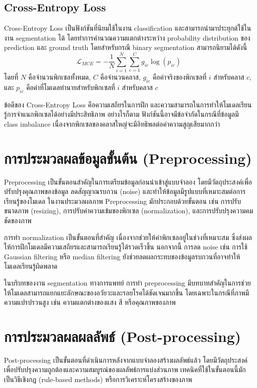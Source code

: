 \subsection{Cross-Entropy Loss}
Cross-Entropy Loss เป็นฟังก์ชันที่นิยมใช้ในงาน classification และสามารถนำมาประยุกต์ใช้ในงาน segmentation ได้ โดยทำการคำนวณความแตกต่างระหว่าง probability distribution ของ prediction และ ground truth โดยสำหรับกรณี binary segmentation สามารถนิยามได้ดังนี้
\begin{equation}
\mathcal{L}_{MCE} = -\frac{1}{N} \sum_{i=1}^{N} \sum_{c=1}^{C} g_{ic} \log(p_{ic})
\end{equation}
โดยที่ $N$ คือจำนวนพิกเซลทั้งหมด, $C$ คือจำนวนคลาส, $g_{ic}$ คือค่าจริงของพิกเซลที่ $i$ สำหรับคลาส $c$, และ $p_{ic}$ คือค่าที่โมเดลทำนายสำหรับพิกเซลที่ $i$ สำหรับคลาส $c$

ข้อดีของ Cross-Entropy Loss คือความเสถียรในการฝึก และความสามารถในการทำให้โมเดลเรียนรู้การจำแนกพิกเซลได้อย่างมีประสิทธิภาพ อย่างไรก็ตาม ฟังก์ชันนี้อาจมีข้อจำกัดในกรณีที่ข้อมูลมี class imbalance เนื่องจากพิกเซลของคลาสใหญ่จะมีอิทธิพลต่อค่าความสูญเสียมากกว่า \cite{goodfellow2016deep}



\section{การประมวลผลข้อมูลขั้นต้น (Preprocessing)}
Preprocessing เป็นขั้นตอนสำคัญในการเตรียมข้อมูลก่อนนำเข้าสู่แบบจำลอง โดยมีวัตถุประสงค์เพื่อปรับปรุงคุณภาพของข้อมูล ลดสัญญาณรบกวน (noise) และทำให้ข้อมูลมีรูปแบบที่เหมาะสมต่อการเรียนรู้ของโมเดล \cite{goodfellow2016deep} ในงานประมวลผลภาพ Preprocessing มักประกอบด้วยขั้นตอน เช่น การปรับขนาดภาพ (resizing), การปรับค่าความเข้มของพิกเซล (normalization), และการปรับปรุงความคมชัดของภาพ

การทำ normalization เป็นขั้นตอนที่สำคัญ เนื่องจากช่วยให้ค่าพิกเซลอยู่ในช่วงที่เหมาะสม ซึ่งส่งผลให้การฝึกโมเดลมีความเสถียรและสามารถเรียนรู้ได้รวดเร็วขึ้น นอกจากนี้ การลด noise เช่น การใช้ Gaussian filtering หรือ median filtering ยังช่วยลดผลกระทบของข้อมูลรบกวนที่อาจทำให้โมเดลเรียนรู้ผิดพลาด

ในบริบทของงาน segmentation ทางการแพทย์ การทำ preprocessing มีบทบาทสำคัญในการช่วยให้โมเดลสามารถแยกแยะลักษณะของอวัยวะและรอยโรคได้ชัดเจนมากขึ้น โดยเฉพาะในกรณีที่ภาพมีความแปรปรวนสูง เช่น ความแตกต่างของแสง สี หรือคุณภาพของภาพ \cite{litjens2017survey}



\section{การประมวลผลผลลัพธ์ (Post-processing)}
Post-processing เป็นขั้นตอนที่ดำเนินการหลังจากแบบจำลองสร้างผลลัพธ์แล้ว โดยมีวัตถุประสงค์เพื่อปรับปรุงความถูกต้องและความสมบูรณ์ของผลลัพธ์การแบ่งส่วนภาพ \cite{haralick1985image} เทคนิคที่ใช้ในขั้นตอนนี้มักเป็นวิธีเชิงกฎ (rule-based methods) หรือการวิเคราะห์โครงสร้างของภาพ

